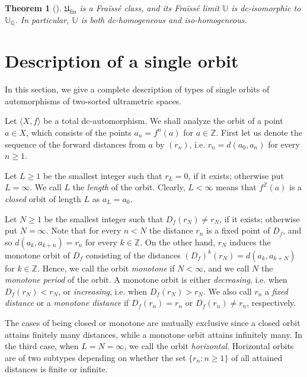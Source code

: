 \documentclass[10pt,a4paper]{article}
\newtheorem{tw}{Theorem}[section]
\theoremstyle{definition}
\theoremstyle{remark}
\newcommand \set [1]{\{#1\}}
\newcommand \seq [1]{\langle #1 \rangle}
\newcommand \Z {\mathbb{Z}}
\newcommand \Q {\mathbb{Q}}
\newcommand \U {\mathbb{U}}
\newcommand \fin {{\operatorname{fin}}}
\newcommand \Ult {\mathfrak{U}}
\begin{document}
\begin{tw}[{\cite[Theorem~3.11]{paper1}}] \label{thm:U_Fraisse}
    $\Ult_\fin$ is a Fraïssé class, and its Fraïssé limit $\U$ is dc-isomorphic to $\U_\Q$.
    In particular, $\U$ is both dc-homogeneous and iso-homogeneous.
\end{tw}



\section{Description of a single orbit}

In this section, we give a complete description of types of single orbits of automorphisms of two-sorted ultrametric spaces.

Let $\seq{X, f}$ be a total dc-automorphism.
We shall analyze the orbit of a point $a \in X$, which consists of the points $a_n = f^n(a)$ for $a \in \Z$.
First let us denote the sequence of the forward distances from $a$ by $(r_n)$, i.e. $r_n = d(a_0, a_n)$ for every $n \geq 1$.

Let $L \geq 1$ be the smallest integer such that $r_L = 0$, if it exists; otherwise put $L = \infty$.
We call $L$ the \emph{length} of the orbit.
Clearly, $L < \infty$ means that $f^\Z(a)$ is a \emph{closed} orbit of length $L$ as $a_L = a_0$.

Let $N \geq 1$ be the smallest integer such that $D_f(r_N) \neq r_N$, if it exists; otherwise put $N = \infty$.
Note that for every $n < N$ the distance $r_n$ is a fixed point of $D_f$, and so $d(a_k, a_{k + n}) = r_n$ for every $k \in \Z$.
On the other hand, $r_N$ induces the monotone orbit of $D_f$ consisting of the distances $(D_f)^k(r_N) = d(a_k, a_{k + N})$ for $k \in \Z$.
Hence, we call the orbit \emph{monotone} if $N < \infty$, and we call $N$ the \emph{monotone period} of the orbit.
A monotone orbit is either \emph{decreasing}, i.e. when $D_f(r_N) < r_N$, or \emph{increasing}, i.e. when $D_f(r_N) > r_N$.
We also call $r_n$ a \emph{fixed distance} or a \emph{monotone distance} if $D_f(r_n) = r_n$ or $D_f(r_n) \neq r_n$, respectively.

The cases of being closed or monotone are mutually exclusive since a closed orbit attains finitely many distances, while a monotone orbit attains infinitely many.
In the third case, when $L = N = \infty$, we call the orbit \emph{horizontal}.
Horizontal orbits are of two subtypes depending on whether the set $\set{r_n: n \geq 1}$ of all attained distances is finite or infinite.
\end{document}
